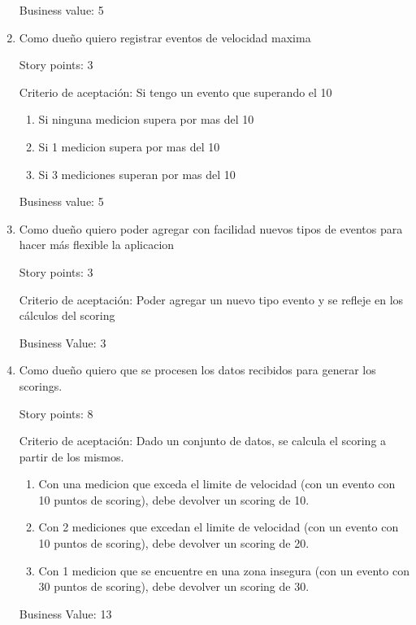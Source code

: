 \begin{enumerate}
Business value: 5


\item Como dueño quiero registrar eventos de velocidad maxima

Story points: 3

Criterio de aceptación:
Si tengo un evento que superando el 10%
\begin{enumerate}
	\item Si ninguna medicion supera por mas del 10%
	\item Si 1 medicion supera por mas del 10%
	\item Si 3 mediciones superan por mas del 10%
\end{enumerate}

Business value: 5


\item Como dueño quiero poder agregar con facilidad nuevos tipos de eventos para hacer más flexible la aplicacion

Story points: 3

Criterio de aceptación:
Poder agregar un nuevo tipo evento y se refleje en los cálculos del scoring

Business Value: 3


\item Como dueño quiero que se procesen los datos recibidos para generar los scorings.

Story points: 8

Criterio de aceptación:
Dado un conjunto de datos, se calcula el scoring a partir de los mismos.
\begin{enumerate}
	\item Con una medicion que exceda el limite de velocidad (con un evento con 10 puntos de scoring), debe devolver un scoring de 10.
	\item Con 2 mediciones que excedan el limite de velocidad (con un evento con 10 puntos de scoring), debe devolver un scoring de 20.
	\item Con 1 medicion que se encuentre en una zona insegura (con un evento con 30 puntos de scoring), debe devolver un scoring de 30.
\end{enumerate}

Business Value: 13


\end{enumerate}